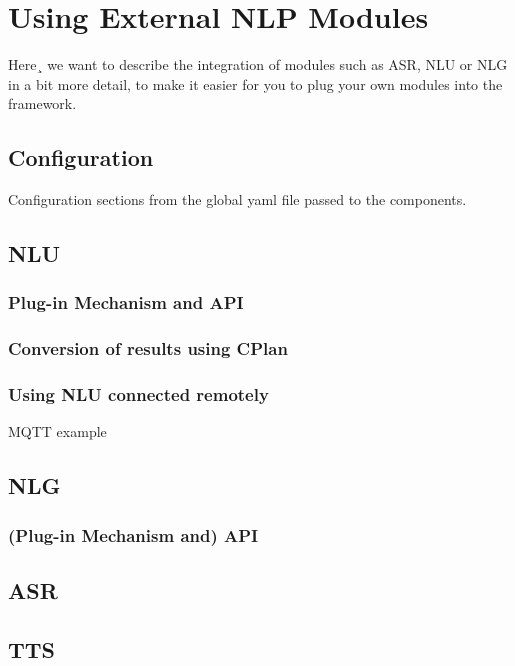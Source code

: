 \chapter{Using External NLP Modules} \label{sec:external_nlp}

Here¸ we want to describe the integration of modules such as ASR, NLU
or NLG in a bit more detail, to make it easier for you to plug your
own modules into the \vonda framework.


\section{Configuration}
Configuration sections from the global yaml file passed to the
components.

\section{NLU}
\subsection{Plug-in Mechanism and API}
\subsection{Conversion of results using CPlan}
\subsection{Using NLU connected remotely}
MQTT example

\section{NLG}
\subsection{(Plug-in Mechanism and) API}

\section{ASR}
\section{TTS}
